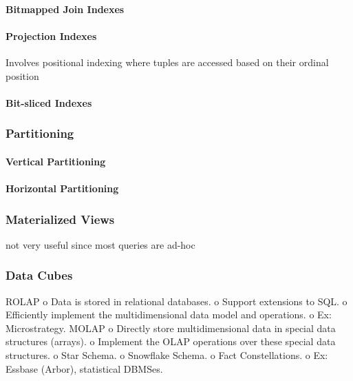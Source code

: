 \documentclass[12pt,a4paper]{article}
\begin{document}
\paragraph{Bitmapped Join Indexes}
\cite{212001}


\paragraph{Projection Indexes}
Involves positional indexing where tuples are accessed based on their ordinal position \cite{628286}

\paragraph{Bit-sliced Indexes}


\subsubsection{Partitioning}
\cite{thusoo2010data}
\paragraph{Vertical Partitioning}

\paragraph{Horizontal Partitioning}

\subsubsection{Materialized Views}
not very useful since most queries are ad-hoc \cite{653447}
\cite{355309}

\subsubsection{Data Cubes}
\cite{Cheung20011}
ROLAP
          o Data is stored in relational databases.
          o Support extensions to SQL.
          o Efficiently implement the multidimensional data model and operations.
          o Ex: Microstrategy.
MOLAP
          o Directly store multidimensional data in special data structures (arrays).
          o Implement the OLAP operations over these special data structures.
          o Star Schema.
          o Snowflake Schema. \cite{kimball2009data}
          o Fact Constellations.
          o Ex: Essbase (Arbor), statistical DBMSes.
\end{document}
